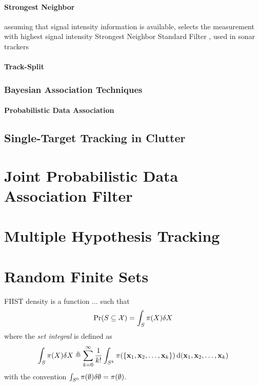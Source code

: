 \documentclass[a4paper]{scrreprt}
\theoremstyle{theorem}
\theoremstyle{definition}
\begin{document}
\subsubsection{Strongest Neighbor}
assuming that signal intensity information is available, selects the measurement with highest signal intensity
Strongest Neighbor Standard Filter \citep{Bar-Shalom1995}, used in sonar trackers

\subsubsection{Track-Split}


\subsection{Bayesian Association Techniques}

\subsubsection{Probabilistic Data Association}




\section{Single-Target Tracking in Clutter}\label{sec:single-target_tracking_in_clutter}










\chapter{Joint Probabilistic Data Association Filter}\label{ch:jpda_filter}




\chapter{Multiple Hypothesis Tracking}\label{ch:multiple_hypothesis_tracking}




\chapter{Random Finite Sets}\label{ch:random_finite_sets}

FIIST density is a function ... such that 
\begin{equation}\label{eq:fiist_density}
	\mathrm{Pr}(S \subseteq \mathcal{X}) = \int_S \pi(X) \dsx[X]
\end{equation}
where the \emph{set integral} is defined as
\begin{equation}\label{eq:set_integral}
	\int_S \pi(X) \dsx[X] \triangleq \sum_{k=0}^{\infty}\frac{1}{k!}\int_{S^k} \pi(\Bqty{\inVar_1, \inVar_2, \ldots, \inVar_k}) \dx[(\inVar_1, \inVar_2, \ldots, \inVar_k)]
\end{equation}
with the convention \( \int_{S^0} \pi(\emptyset) \dsx[\emptyset] = \pi(\emptyset) \).
\end{document}
